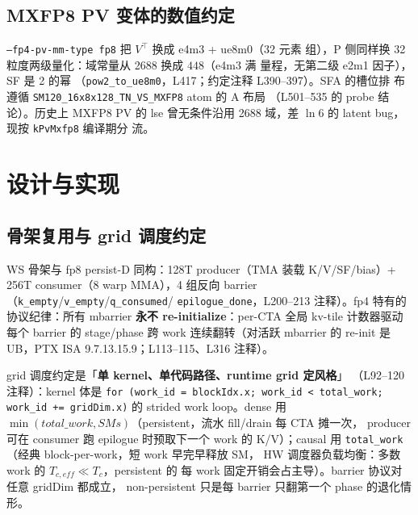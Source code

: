 \subsection{MXFP8 PV 变体的数值约定}

\texttt{--fp4-pv-mm-type fp8} 把 $V^\top$ 换成 e4m3 + ue8m0（32 元素
组），P 侧同样换 32 粒度两级量化：域常量从 2688 换成 $448$（e4m3 满
量程，无第二级 e2m1 因子），SF 是 2 的幂
（\texttt{pow2\_to\_ue8m0}，L417；约定注释 L390--397）。SFA 的槽位排
布遵循 \texttt{SM120\_16x8x128\_TN\_VS\_MXFP8} atom 的 A 布局
（L501--535 的 probe 结论）。历史上 MXFP8 PV 的 lse 曾无条件沿用
2688 域，差 $\ln 6$ 的 latent bug，现按 \texttt{kPvMxfp8} 编译期分
流。

\section{设计与实现}

\subsection{骨架复用与 grid 调度约定}

WS 骨架与 fp8 persist-D 同构：128T producer（TMA 装载 K/V/SF/bias）+
256T consumer（8 warp MMA），4 组反向 barrier
（\texttt{k\_empty}/\texttt{v\_empty}/\texttt{q\_consumed}/
\texttt{epilogue\_done}，L200--213 注释）。fp4 特有的协议纪律：所有
mbarrier \textbf{永不 re-initialize}：per-CTA 全局 kv-tile 计数器驱动
每个 barrier 的 stage/phase 跨 work 连续翻转（对活跃 mbarrier 的
re-init 是 UB，PTX ISA 9.7.13.15.9；L113--115、L316 注释）。

grid 调度约定是「\textbf{单 kernel、单代码路径、runtime grid 定风格}」
（L92--120 注释）：kernel 体是
\texttt{for (work\_id = blockIdx.x; work\_id < total\_work; work\_id +=
gridDim.x)} 的 strided work loop。dense 用
$\min(total\_work, SMs)$（persistent，流水 fill/drain 每 CTA 摊一次，
producer 可在 consumer 跑 epilogue 时预取下一个 work 的 K/V）；causal
用 \texttt{total\_work}（经典 block-per-work，短 work 早完早释放 SM，
HW 调度器负载均衡：多数 work 的 $T_{c,eff}\ll T_c$，persistent 的
每 work 固定开销会占主导）。barrier 协议对任意 gridDim 都成立，
non-persistent 只是每 barrier 只翻第一个 phase 的退化情形。

